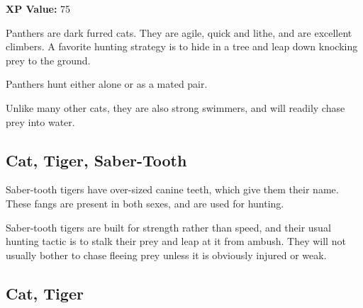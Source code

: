 \begin{multicols*}{2}
{\textbf{XP Value:} 75}

Panthers are dark furred cats. They are agile, quick and lithe, and are excellent climbers. A favorite hunting strategy is to hide in a tree and leap down knocking prey to the ground.

Panthers hunt either alone or as a mated pair.

Unlike many other cats, they are also strong swimmers, and will readily chase prey into water.

\subsection{Cat, Tiger, Saber-Tooth}\label{monster:Saber-Tooth Tiger}

Saber-tooth tigers have over-sized canine teeth, which give them their name. These fangs are present in both sexes, and are used for hunting.

Saber-tooth tigers are built for strength rather than speed, and their usual hunting tactic is to stalk their prey and leap at it from ambush. They will not usually bother to chase fleeing prey unless it is obviously injured or weak.

\subsection{Cat, Tiger}
\end{multicols*}
